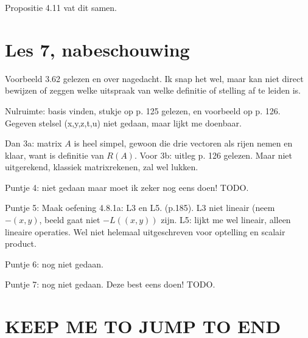 \documentclass{article}
\begin{document}
Propositie 4.11 vat dit samen. 

\section{Les 7, nabeschouwing}

Voorbeeld 3.62 gelezen en over nagedacht. Ik snap het wel, maar kan niet direct bewijzen of zeggen welke uitspraak van welke definitie of stelling af te leiden is. 

Nulruimte: basis vinden, stukje op p. 125 gelezen, en voorbeeld op p. 126. Gegeven stelsel (x,y,z,t,u) niet gedaan, maar lijkt me doenbaar. 

Dan 3a: matrix $A$ is heel simpel, gewoon die drie vectoren als rijen nemen en klaar, want is definitie van $R(A)$. Voor 3b: uitleg p. 126 gelezen. Maar niet uitgerekend, klassiek matrixrekenen, zal wel lukken. 

Puntje 4: niet gedaan maar moet ik zeker nog eens doen! TODO. 

Puntje 5: Maak oefening 4.8.1a: L3 en L5. (p.185). L3 niet lineair (neem $-(x,y)$, beeld gaat niet $-L((x,y))$ zijn. L5: lijkt me wel lineair, alleen lineaire operaties. Wel niet helemaal uitgeschreven voor optelling en scalair product. 

Puntje 6: nog niet gedaan.

Puntje 7: nog niet gedaan. Deze best eens doen! TODO. 


\section{KEEP ME TO JUMP TO END}
\end{document}
